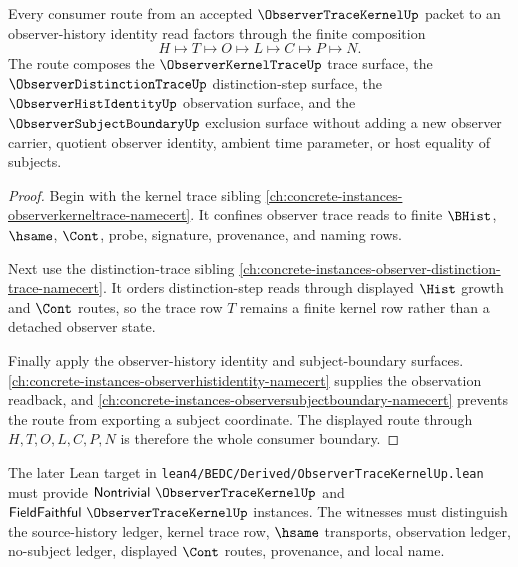 \begin{theorem}
\label{thm:observer-trace-kernel-composition-boundary}
Every consumer route from an accepted $\ObserverTraceKernelUp$ packet to an observer-history identity read factors through the finite composition
$$
H \longmapsto T \longmapsto O \longmapsto L \longmapsto C \longmapsto P \longmapsto N.
$$
The route composes the $\ObserverKernelTraceUp$ trace surface, the $\ObserverDistinctionTraceUp$ distinction-step surface, the $\ObserverHistIdentityUp$ observation surface, and the $\ObserverSubjectBoundaryUp$ exclusion surface without adding a new observer carrier, quotient observer identity, ambient time parameter, or host equality of subjects.
\end{theorem}
\begin{proof}
Begin with the kernel trace sibling \autoref{ch:concrete-instances-observerkerneltrace-namecert}. It confines observer trace reads to finite $\BHist$, $\hsame$, $\Cont$, probe, signature, provenance, and naming rows.

Next use the distinction-trace sibling \autoref{ch:concrete-instances-observer-distinction-trace-namecert}. It orders distinction-step reads through displayed $\Hist$ growth and $\Cont$ routes, so the trace row $T$ remains a finite kernel row rather than a detached observer state.

Finally apply the observer-history identity and subject-boundary surfaces. \autoref{ch:concrete-instances-observerhistidentity-namecert} supplies the observation readback, and \autoref{ch:concrete-instances-observersubjectboundary-namecert} prevents the route from exporting a subject coordinate. The displayed route through $H,T,O,L,C,P,N$ is therefore the whole consumer boundary.
\end{proof}

The later Lean target in \texttt{lean4/BEDC/Derived/ObserverTraceKernelUp.lean} must provide $\mathsf{Nontrivial}\ \ObserverTraceKernelUp$ and $\mathsf{FieldFaithful}\ \ObserverTraceKernelUp$ instances. The witnesses must distinguish the source-history ledger, kernel trace row, $\hsame$ transports, observation ledger, no-subject ledger, displayed $\Cont$ routes, provenance, and local name.



